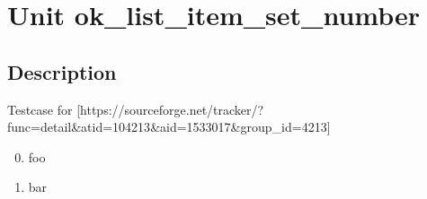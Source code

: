 \documentclass{report}
\begin{document}
\newlength{\tmplength}
\chapter{Unit ok{\_}list{\_}item{\_}set{\_}number}
\section{Description}
Testcase for [https://sourceforge.net/tracker/?func=detail{\&}atid=104213{\&}aid=1533017{\&}group{\_}id=4213]\hfill\vspace*{1ex}



\begin{enumerate}
\setcounter{enumi}{-1} \setcounter{enumii}{-1} \setcounter{enumiii}{-1} \setcounter{enumiv}{-1} 
\item foo
\setcounter{enumi}{0} \setcounter{enumii}{0} \setcounter{enumiii}{0} \setcounter{enumiv}{0} 
\item bar
\end{enumerate}
\end{document}
